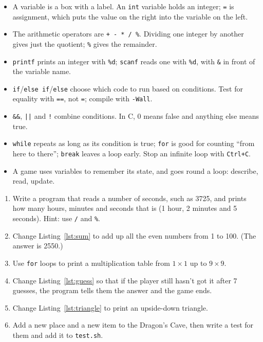 \begin{itemize}
  \item A variable is a box with a label. An \texttt{int} variable holds an integer; \texttt{=} is assignment, which puts the value on the right into the variable on the left.
  \item The arithmetic operators are \texttt{+ - * / \%}. Dividing one integer by another gives just the quotient; \texttt{\%} gives the remainder.
  \item \texttt{printf} prints an integer with \texttt{\%d}; \texttt{scanf} reads one with \texttt{\%d}, with \texttt{\&} in front of the variable name.
  \item \texttt{if}/\texttt{else if}/\texttt{else} choose which code to run based on conditions. Test for equality with \texttt{==}, not \texttt{=}; compile with \texttt{-Wall}.
  \item \texttt{\&\&}, \texttt{||} and \texttt{!} combine conditions. In C, 0 means false and anything else means true.
  \item \texttt{while} repeats as long as its condition is true; \texttt{for} is good for counting ``from here to there''; \texttt{break} leaves a loop early. Stop an infinite loop with \texttt{Ctrl+C}.
  \item A game uses variables to remember its state, and goes round a loop: describe, read, update.
\end{itemize}


\begin{enumerate}
  \item Write a program that reads a number of seconds, such as 3725, and prints how many hours, minutes and seconds that is (1 hour, 2 minutes and 5 seconds). Hint: use \texttt{/} and \texttt{\%}.
  \item Change Listing~\ref{lst:sum} to add up all the even numbers from 1 to 100. (The answer is 2550.)
  \item Use \texttt{for} loops to print a multiplication table from $1 \times 1$ up to $9 \times 9$.
  \item Change Listing~\ref{lst:guess} so that if the player still hasn't got it after 7 guesses, the program tells them the answer and the game ends.
  \item Change Listing~\ref{lst:triangle} to print an upside-down triangle.
  \item Add a new place and a new item to the Dragon's Cave, then write a test for them and add it to \texttt{test.sh}.
\end{enumerate}
